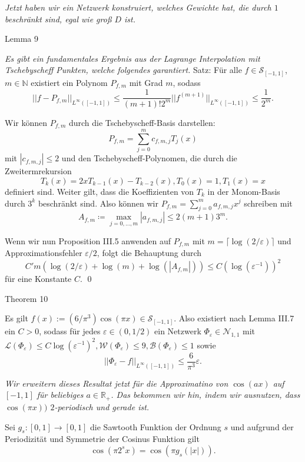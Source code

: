 \documentclass[12pt]{article}
\newcommand{\N}{\mathbb{N}} %
\newcommand{\R}{\mathbb{R}} %
\begin{document}
\textit{Jetzt haben wir ein Netzwerk konstruiert, welches Gewichte hat, die durch \(1\) 
beschränkt sind, egal wie groß \(D\) ist.}

\newpage

{\Large Lemma 9} %

\textit{Es gibt ein fundamentales Ergebnis aus der Lagrange Interpolation mit 
Tschebyscheff Punkten, welche folgendes garantiert.}
Satz: 
Für alle \(f\in \mathcal{S}_{[-1,1]}\), \(m\in\N\) existiert ein Polynom 
\(P_{f,m}\) mit Grad \(m\), sodass 
\[ ||f - P_{f,m}||_{L^\infty ([-1,1])} \leq \frac{1}{(m+1)!2^m} ||f^{(m+1)}||_{L^\infty ([-1,1])} \leq \frac{1}{2^m}. \]

Wir können \(P_{f,m}\) durch die Tschebyscheff-Basis darstellen: 
\[ P_{f,m} = \sum_{j=0}^m c_{f,m,j} T_j(x) \]
mit \(|c_{f,m,j}| \leq 2\) 
und den Tschebyscheff-Polynomen, die durch die Zweitermrekursion 
\[ T_k(x) = 2x T_{k-1}(x) - T_{k-2}(x), T_0(x) = 1, T_1(x) = x \]
definiert sind.
Weiter gilt, dass die Koeffizienten von \(T_k\) in der Monom-Basis 
durch \(3^k\) beschränkt sind. 
Also können wir \(P_{f,m} = \sum_{j=0}^m a_{f,m,j} x^j\) schreiben mit 
\[ A_{f,m} \coloneqq \max_{j=0,\ldots, m} |a_{f,m,j}| \leq 2(m+1)3^m. \] 

Wenn wir nun Proposition III.5 anwenden auf \(P_{f,m}\) mit \(m= \lceil \log(2/\varepsilon)\rceil\) 
und Approximationsfehler \(\varepsilon/2\), folgt die Behauptung durch
\[ C' m(\log(2/\varepsilon) + \log(m) + \log(|A_{f,m}|)) \leq C (\log(\varepsilon^{-1}))^2 \]
für eine Konstante \(C\). \qed

\newpage

{\Large Theorem 10} %

Es gilt \(f(x) := (6/\pi^3) \cos(\pi x) \in \mathcal{S}_{[-1,1]}\). Also existiert nach Lemma III.7 
ein \(C>0\), sodass für jedes \(\varepsilon \in (0,1/2)\) ein Netzwerk \(\Phi_\varepsilon \in \mathcal{N}_{1,1}\) 
mit \(\mathcal{L}(\Phi_\varepsilon) \leq C \log(\varepsilon^{-1})^2, \mathcal{W}(\Phi_\varepsilon) \leq 9, 
\mathcal{B}(\Phi_\varepsilon) \leq 1\) sowie 
\[ ||\Phi_\varepsilon - f ||_{L^{\infty}([-1,1])} \leq \frac{6}{\pi^3} \varepsilon. \tag{\(*\)} \]

\textit{Wir erweitern dieses Resultat jetzt für die Approximatino von \(\cos(ax)\) auf \([-1,1]\) für beliebiges \(a\in \R_+\). 
Das bekommen wir hin, indem wir ausnutzen, dass \(\cos(\pi x))\) \(2\)-periodisch und gerade ist.}

Sei \(g_s:[0,1] \rightarrow [0,1]\) die Sawtooth Funktion der Ordnung \(s\) und aufgrund der Periodizität und Symmetrie der Cosinus Funktion gilt 
\[ \cos(\pi 2^s x) = \cos(\pi g_s(|x|)). \]
\end{document}
